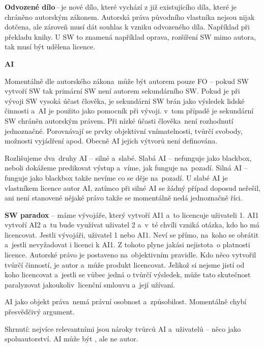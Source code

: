 \textbf{Odvozené dílo}\,--\,je nové dílo, které vychází z již existujícího díla, které je chráněno autorským zákonem. Autorská práva původního vlastníka nejsou nijak dotčena, ale zároveň musí dát souhlas k vzniku odvozeného díla. Například při překladu knihy. U SW to znamená například oprava, rozšíření SW mimo autora, tak musí být udělena licence. 

\vspace{1cm}
\noindent\textbf{AI}

\noindent Momentálně dle autorského zákona~může být autorem pouze FO -- pokud SW vytvoří SW tak primární SW není autorem sekundárního SW. Pokud je při vývoji SW vysoká účast člověka, je sekundární SW brán jako výsledek lidské činnosti a~AI je použito jako pomocník při vývoji. v~tom případě je sekundární SW chráněn autorským právem. Při nízké účasti člověka~není rozhodnutí jednoznačné. Porovnávají se prvky objektivní vnímatelnosti, tvůrčí svobody, možnosti vyjádření apod. Obecně AI jejich výtvorů není definována. 

Rozlišujeme dva~druhy AI -- silné a~slabé. Slabá AI -- nefunguje jako blackbox, neboli dokážeme predikovat výstup a~víme, jak funguje na~pozadí. Silná AI -- funguje jako blackbox takže nevíme co se děje na~pozadí. U slabé AI je vlastníkem licence autor AI, zatímco při silné AI se žádný případ doposud neřešil, ani není stanovené nějaké právo takže se momentálně nedá jednoznačně říci.

\textbf{SW paradox} -- máme vývojáře, který vytvoří AI1 a~to licencuje uživateli 1. AI1 vytvoří AI2 a~tu bude využívat uživatel 2 a~v~té chvíli vzniká otázka, kdo ho má licencovat. Jestli vývojáři, uživatel 1 nebo AI1. Neví se přímo, na~koho se obrátit a~jestli nevyžadovat i licenci k AI1. Z tohoto plyne jakási nejistota~o platnosti licence. Autorské právo je postaveno na~objektivním pravidle. Kdo něco vytvořil tvůrčí činností, je autor a~může produkt licencovat. Jelikož si nejsme jistí od koho licencovat a~jestli se vůbec jedná o tvůrčí výsledek, může tato skutečnost paralyzovat jakoukoliv~licenční smlouvu a~její užívaní.

AI jako objekt práva~nemá právní osobnost a~způsobilost. Momentálně chybí přesvědčivý argument. 

Shrnutí: nejvíce relevantními jsou nároky tvůrců AI a~uživatelů -- něco jako spoluautorství. AI může být , ale ne autor.










